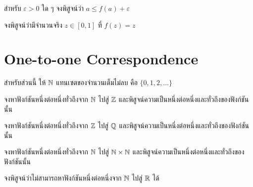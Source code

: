 \begin{exercise}
สำหรับ $\varepsilon > 0$ ใด ๆ จงพิสูจน์ว่า $a \leq f(a) + \varepsilon$
\end{exercise}

\begin{exercise}
จงพิสูจน์ว่ามีจำนวนจริง $z \in [0, 1]$ ที่ $f(z) = z$
\end{exercise}

\section{One-to-one Correspondence}

สำหรับส่วนนี้ ให้ $\mathbb{N}$ แทนเซตของจำนวนเต็มไม่ลบ คือ $\{0, 1, 2, \dots\}$

\begin{exercise}
จงหาฟังก์ชันหนึ่งต่อหนึ่งทั่วถึงจาก $\mathbb{N}$ ไปสู่ $\mathbb{Z}$ และพิสูจน์ความเป็นหนึ่งต่อหนึ่งและทั่วถึงของฟังก์ชันนั้น
\end{exercise}

\begin{exercise}
จงหาฟังก์ชันหนึ่งต่อหนึ่งทั่วถึงจาก $\mathbb{Z}$ ไปสู่ $\mathbb{Q}$ และพิสูจน์ความเป็นหนึ่งต่อหนึ่งและทั่วถึงของฟังก์ชันนั้น
\end{exercise}

\begin{exercise}
จงหาฟังก์ชันหนึ่งต่อหนึ่งทั่วถึงจาก $\mathbb{N}$ ไปสู่ $\mathbb{N} \times \mathbb{N}$ และพิสูจน์ความเป็นหนึ่งต่อหนึ่งและทั่วถึงของฟังก์ชันนั้น
\end{exercise}

\begin{bonus}
จงพิสูจน์ว่าไม่สามารถหาฟังก์ชันหนึ่งต่อหนึ่งจาก $\mathbb{N}$ ไปสู่ $\mathbb{R}$ ได้
\end{bonus}